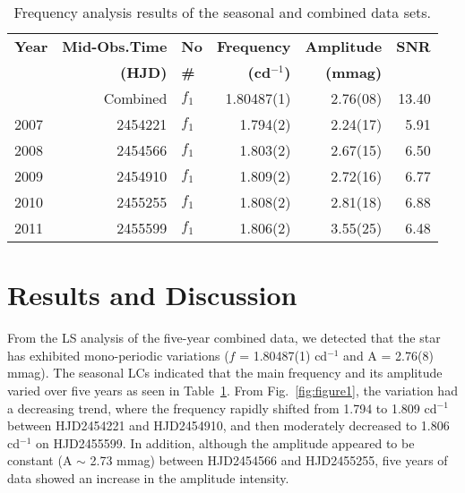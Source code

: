 \documentclass[]{article}
\begin{document}
 \begin{table}[!t]
\footnotesize
\begin{center}
\caption[Frequency analysis results of 13\,Tau]{Frequency analysis results of the seasonal and combined data sets. }
\smallskip
\begin{tabular}{l r l r r r}
\hline
\noalign{\smallskip}
\textbf{Year}&\textbf{Mid-Obs.Time}&\textbf{No}&\textbf{Frequency}&\textbf{Amplitude}&\textbf{SNR}\\
&\textbf{(HJD)}&\textbf{\#}&\textbf{(cd$^{-1}$)}&\textbf{(mmag)}&\\
\noalign{\smallskip}
\hline
\noalign{\smallskip}
& Combined	&	$f_1$	&	1.80487(1)	&	2.76(08)	&	13.40		\\
\hline
\noalign{\smallskip}
2007 & 2454221	&	$f_1$	&	1.794(2)	&	2.24(17)	&	5.91		\\
\hline
\noalign{\smallskip}
2008 & 2454566	&	$f_1$	&	1.803(2)	&	2.67(15)	&	6.50		\\
\hline
\noalign{\smallskip}
2009 & 2454910	&	$f_1$	&	1.809(2)	&	2.72(16)	&	6.77		\\
\hline
\noalign{\smallskip}
2010 & 2455255	&	$f_1$	&	1.808(2)	&	2.81(18)	&	6.88		\\
\hline
\noalign{\smallskip}
2011 & 2455599	&	$f_1$	&	1.806(2)	&	3.55(25)	&	6.48		\\
\hline
\end{tabular}
\label{tab:Table1}
\end{center}
\end{table}  


\section{Results and Discussion}


From the LS analysis of the five-year combined data, we detected that the star has exhibited mono-periodic variations ($f$ = 1.80487(1) cd$^{-1}$ and A = 2.76(8) mmag). The seasonal LCs indicated that the main frequency and its amplitude varied over five years as seen in Table~\ref{tab:Table1}. From Fig.~\ref{fig:figure1}, the variation had a decreasing trend, where the frequency rapidly shifted from 1.794 to 1.809 cd$^{-1}$ between HJD2454221 and HJD2454910, and then moderately decreased to 1.806 cd$^{-1}$ on HJD2455599. In addition, although the amplitude appeared to be constant (A $\sim$ 2.73 mmag) between HJD2454566 and HJD2455255, five years of data showed an increase in the amplitude intensity.
\end{document}
